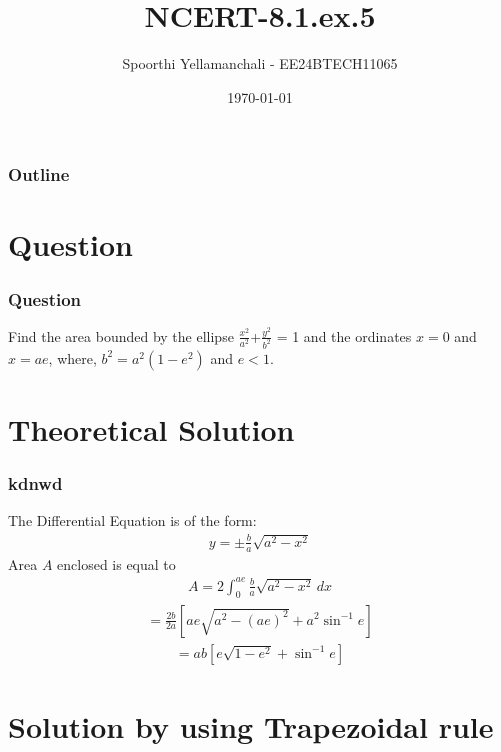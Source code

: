 \documentclass{beamer}
\title{NCERT-8.1.ex.5}
\author{Spoorthi Yellamanchali - EE24BTECH11065}
\date{\today}
\providecommand{\brak}[1]{\ensuremath{\left(#1\right)}}
\theoremstyle{remark}
\numberwithin{equation}{section}
\begin{document}
\begin{frame}
\titlepage
\end{frame}

\begin{frame}
\frametitle{Outline}
\tableofcontents
\end{frame}

\section{Question}
\begin{frame}
\frametitle{Question}
Find the area bounded by the ellipse $\frac{x^2}{a^2}$+$\frac{y^2}{b^2}$ = 1 and the ordinates $x=0$ and $x = ae$, where, $b^2 = a^2\brak{1 - e^2}$ and $e < 1$.
\\
\end{frame}

\section{Theoretical Solution}
\begin{frame}
\frametitle{kdnwd}
The Differential Equation is of the form:
\begin{align}
 y = \pm \frac{b}{a}\sqrt{a^2 - x^2}
\end{align}
Area $A$ enclosed is equal to 
\begin{align}
    A = 2\int_0^{ae} \frac{b}{a}\sqrt{a^2 - x^2}\,dx
    \end{align}
    \begin{align}
      = \frac{2b}{2a}\left[ae\sqrt{a^2 - \brak{ae}^2} + a^2\sin^{-1}{e} \right]
      \end{align}
\begin{align}
      = ab\left[e\sqrt{1 - e^2} + \sin^{-1}{e}\right]
\end{align}
\end{frame}

\section{Solution by using Trapezoidal rule}
\end{document}
